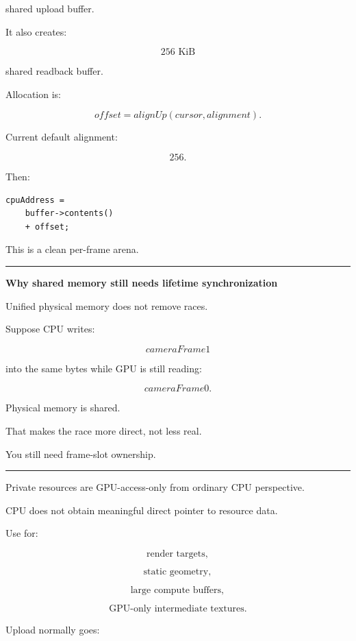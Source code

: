shared upload buffer.

It also creates:

\[
256\text{ KiB}
\]

shared readback buffer.

Allocation is:

\[
offset=
alignUp(cursor,alignment).
\]

Current default alignment:

\[
256.
\]

Then:

\begin{verbatim}
cpuAddress =
    buffer->contents()
    + offset;
\end{verbatim}

This is a clean per-frame arena.

\begin{center}\rule{0.5\linewidth}{0.5pt}\end{center}

\textbf{Why shared memory still needs lifetime synchronization}

Unified physical memory does not remove races.

Suppose CPU writes:

\[
cameraFrame1
\]

into the same bytes while GPU is still reading:

\[
cameraFrame0.
\]

Physical memory is shared.

That makes the race more direct, not less real.

You still need frame-slot ownership.

\begin{center}\rule{0.5\linewidth}{0.5pt}\end{center}

\textbf{}

Private resources are GPU-access-only from ordinary CPU perspective.

CPU does not obtain meaningful direct pointer to resource data.

Use for:

\[
\text{render targets},
\]

\[
\text{static geometry},
\]

\[
\text{large compute buffers},
\]

\[
\text{GPU-only intermediate textures}.
\]

Upload normally goes:

